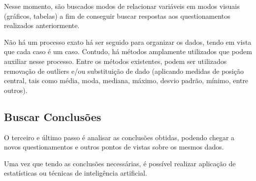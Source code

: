 Nesse momento, são buscados modos de relacionar variáveis em modos visuais (gráficos, tabelas) a fim de conseguir buscar respostas aos questionamentos realizados anteriormente. 

Não há um processo exato há ser seguido para organizar os dados, tendo em vista que cada caso é um caso. Contudo, há métodos amplamente utilizados que podem auxiliar nesse processo. Entre os métodos existentes, podem ser utilizados removação de outliers e/ou substituição de dado (aplicando medidas de posição central, tais como média, moda, mediana, máximo, desvio padrão, mínimo, entre outros).

\subsection{Buscar Conclusões}

O terceiro e último passo é analisar as conclusões obtidas, podendo chegar a novos questionamentos e outros pontos de vistas sobre os mesmos dados.

Uma vez que tendo as conclusões necessárias, é possível realizar aplicação de estatísticas ou técnicas de inteligência artificial.



